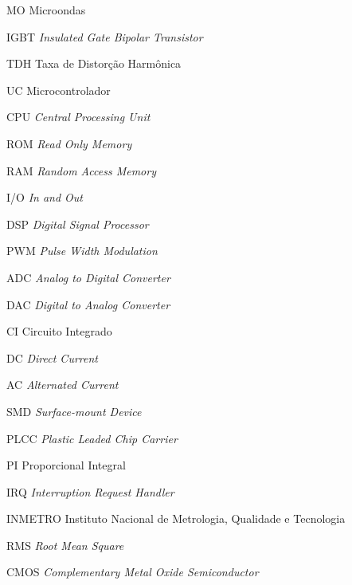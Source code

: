 
\begin{siglas}
    \item[MO] Microondas
    \item[IGBT] \textit{Insulated Gate Bipolar Transistor}
    \item[TDH] Taxa de Distorção Harmônica
    \item[UC] Microcontrolador
    \item[CPU] \textit{Central Processing Unit}
    \item[ROM] \textit{Read Only Memory}
    \item[RAM] \textit{Random Access Memory}
    \item[I/O] \textit{In and Out}
    \item[DSP] \textit{Digital Signal Processor}
    \item[PWM] \textit{Pulse Width Modulation}
    \item[ADC] \textit{Analog to Digital Converter}
    \item[DAC] \textit{Digital to Analog Converter}
    \item[CI] Circuito Integrado
    \item[DC] \textit{Direct Current}
    \item[AC] \textit{Alternated Current}
    \item[SMD] \textit{Surface-mount Device}
    \item[PLCC] \textit{Plastic Leaded Chip Carrier}
    \item[PI] Proporcional Integral
    \item[IRQ] \textit{Interruption Request Handler}
    \item[INMETRO] Instituto Nacional de Metrologia, Qualidade e Tecnologia
    \item[RMS] \textit{Root Mean Square}
    \item[CMOS] \textit{Complementary Metal Oxide Semiconductor}
\end{siglas}

